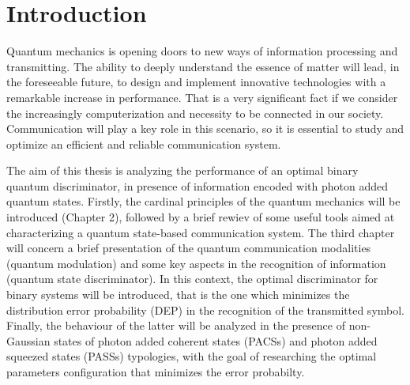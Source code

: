 
\chapter{Introduction}
    Quantum mechanics is opening doors to new ways of information processing and transmitting.
    The ability to deeply understand the essence of matter will lead, in the foreseeable future, to design
    and implement innovative technologies with a remarkable increase in performance.
    That is a very significant fact if we consider the increasingly computerization and necessity to be
    connected in our society.
    Communication will play a key role in this scenario, so it is essential to study and optimize an
    efficient and reliable communication system.

    The aim of this thesis is analyzing the performance of an optimal binary quantum discriminator, in
    presence of information encoded with photon added quantum states.
    Firstly, the cardinal principles of the quantum mechanics will be introduced (Chapter 2), followed
    by a brief rewiev of some useful tools aimed at characterizing a quantum state-based
    communication system.
    The third chapter will concern a brief presentation of the quantum communication modalities
    (quantum modulation) and some key aspects in the recognition of information (quantum state
    discriminator). In this context, the optimal discriminator for binary systems will be introduced, that
    is the one which minimizes the distribution error probability (DEP) in the recognition of the
    transmitted symbol.
    Finally, the behaviour of the latter will be analyzed in the presence of non-Gaussian states of photon
    added coherent states (PACSs) and photon added squeezed states (PASSs) typologies, with the goal
    of researching the optimal parameters configuration that minimizes the error probabilty.